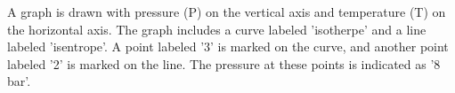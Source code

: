 A graph is drawn with pressure (P) on the vertical axis and temperature (T) on the horizontal axis. The graph includes a curve labeled 'isotherpe' and a line labeled 'isentrope'. A point labeled '3' is marked on the curve, and another point labeled '2' is marked on the line. The pressure at these points is indicated as '8 bar'.